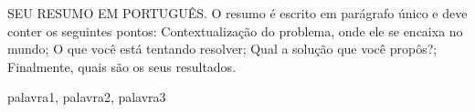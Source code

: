 SEU RESUMO EM PORTUGUÊS. O resumo é escrito em parágrafo único e deve conter os seguintes pontos: Contextualização do problema, onde ele se encaixa no mundo; O que você está tentando resolver; Qual a solução que você propôs?; Finalmente, quais são os seus resultados.

\begin{keywords}
palavra1, palavra2, palavra3
\end{keywords}